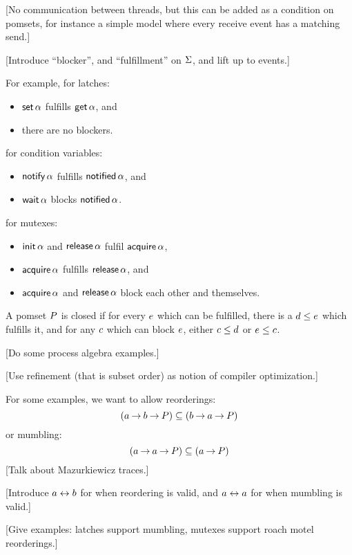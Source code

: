 [No communication between threads, but this can be added as a condition on pomsets,
  for instance a simple model where every receive event has a matching send.]

[Introduce ``blocker'', and ``fulfillment'' on $\Sigma$, and lift up to events.]

For example, for latches:
\begin{itemize}
\item $\mathsf{set}\,\alpha{}$ fulfills $\mathsf{get}\,\alpha{}$, and
\item there are no blockers.
\end{itemize}
for condition variables:
\begin{itemize}
\item $\mathsf{notify}\,\alpha{}$ fulfills $\mathsf{notified}\,\alpha{}$, and
\item $\mathsf{wait}\,\alpha{}$ blocks $\mathsf{notified}\,\alpha{}$.
\end{itemize}
for mutexes:
\begin{itemize}
\item $\mathsf{init}\,\alpha$ and $\mathsf{release}\,\alpha$ fulfil $\mathsf{acquire}\,\alpha{}$,
\item $\mathsf{acquire}\,\alpha$ fulfills $\mathsf{release}\,\alpha$, and
\item $\mathsf{acquire}\,\alpha$ and $\mathsf{release}\,\alpha$ block each other and themselves. 
\end{itemize}
  
\begin{definition}
  A pomset $P$ is closed if
  for every $e$ which can be fulfilled,
  there is a $d\le e$ which fulfills it,
  and for any $c$ which can block $e$, either $c\le d$ or $e\le c$. 
\end{definition}

[Do some process algebra examples.]

[Use refinement (that is subset order) as notion of compiler optimization.]

For some examples, we want to allow reorderings:
\[
  (a \mathbin{\rightarrow} b \mathbin{\rightarrow} P)
\subseteq
  (b \mathbin{\rightarrow} a \mathbin{\rightarrow} P)
\]
or mumbling:
\[
  (a \mathbin{\rightarrow} a \mathbin{\rightarrow} P)
\subseteq
  (a \mathbin{\rightarrow} P)
\]
[Talk about Mazurkiewicz traces.]

[Introduce $a\mathrel\leftrightarrow b$ for when reordering is valid,
  and  $a\mathrel\leftrightarrow a$ for when mumbling is valid.]

[Give examples: latches support mumbling, mutexes support roach motel reorderings.]

